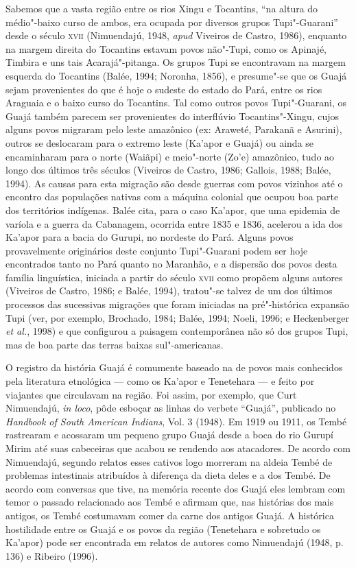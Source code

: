 Sabemos que a vasta região entre os rios Xingu e Tocantins, ``na altura
do médio"-baixo curso de ambos, era ocupada por diversos grupos
Tupi"-Guarani'' desde o século \textsc{xvii} (Nimuendajú, 1948, \emph{apud} Viveiros de
Castro, 1986), enquanto na margem direita do Tocantins estavam povos
não"-Tupi, como os Apinajé, Timbira e uns tais Acarajá"-pitanga. Os grupos
Tupi se encontravam na margem esquerda do Tocantins (Balée, 1994;
Noronha, 1856), e presume"-se que os Guajá sejam provenientes do que é
hoje o sudeste do estado do Pará, entre os rios Araguaia e o baixo curso
do Tocantins. Tal como outros povos Tupi"-Guarani, os Guajá também
parecem ser provenientes do interflúvio Tocantins"-Xingu, cujos alguns
povos migraram pelo leste amazônico (ex: Araweté, Parakanã e Asurini),
outros se deslocaram para o extremo leste (Ka'apor e Guajá) ou ainda se
encaminharam para o norte (Waiãpi) e meio"-norte (Zo'e) amazônico, tudo
ao longo dos últimos três séculos (Viveiros de Castro, 1986; Gallois,
1988; Balée, 1994). As causas para esta migração são desde guerras com
povos vizinhos até o encontro das populações nativas com a máquina
colonial que ocupou boa parte dos territórios indígenas. Balée cita,
para o caso Ka'apor, que uma epidemia de varíola e a guerra da
Cabanagem, ocorrida entre 1835 e 1836, acelerou a ida dos Ka'apor para a
bacia do Gurupi, no nordeste do Pará. Alguns povos provavelmente
originários deste conjunto Tupi"-Guarani podem ser hoje encontrados tanto
no Pará quanto no Maranhão, e a dispersão dos povos desta família
linguística, iniciada a partir do século \textsc{xvii} como propõem alguns
autores (Viveiros de Castro, 1986; e Balée, 1994), tratou"-se talvez de
um dos últimos processos das sucessivas migrações que foram iniciadas na
pré"-histórica expansão Tupi (ver, por exemplo, Brochado, 1984; Balée,
1994; Noeli, 1996; e Heckenberger \emph{et al.}, 1998) e que configurou a
paisagem contemporânea não só dos grupos Tupi, mas de boa parte das
terras baixas sul"-americanas.

O registro da história Guajá é comumente baseado na de povos mais
conhecidos pela literatura etnológica --- como os Ka'apor e Tenetehara ---
e feito por viajantes que circulavam na região. Foi assim, por exemplo,
que Curt Nimuendajú, \emph{in loco}, pôde esboçar as linhas do verbete
``Guajá'', publicado no \emph{Handbook of South American Indians}, Vol. 3
(1948). Em 1919 ou 1911, os Tembé rastrearam e acossaram um pequeno
grupo Guajá desde a boca do rio Gurupí Mirim até suas cabeceiras que
acabou se rendendo aos atacadores. De acordo com Nimuendajú, segundo
relatos esses cativos logo morreram na aldeia Tembé de problemas
intestinais atribuídos à diferença da dieta deles e a dos Tembé. De
acordo com conversas que tive, na memória recente dos Guajá eles lembram
com temor o passado relacionado aos Tembé e afirmam que, nas histórias
dos mais antigos, os Tembé costumavam comer da carne dos antigos Guajá.
A histórica hostilidade entre os Guajá e os povos da região (Tenetehara
e sobretudo os Ka'apor) pode ser encontrada em relatos de autores como
Nimuendajú (1948, p. 136) e Ribeiro (1996).

